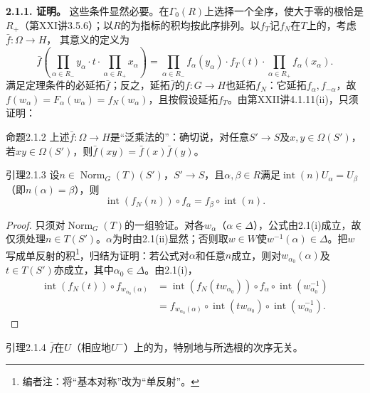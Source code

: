 \textbf{2.1.1. 证明。} 这些条件显然必要。在$\Gamma_0(R)$上选择一个全序，使大于零的根恰是$R_+$（第XXI讲3.5.6）；以$R$的为指标的积均按此序排列。以$f_T$记$f_N$在$T$上的，考虑$\bar f:\Omega\to H$，
其意义的定义为
\[\bar f\left(\prod_{\alpha\in R_-}y_\alpha\cdot t\cdot\prod_{\alpha\in R_+}x_\alpha\right)=\prod_{\alpha\in R_-}f_\alpha(y_\alpha)\cdot f_T(t)\cdot\prod_{\alpha\in R_+}f_\alpha(x_\alpha).\]
满足定理条件的必延拓$\bar f$；反之，延拓$\bar f$的$f:G\to H$也延拓$f_N$：它延拓$f_\alpha,f_{-\alpha}$，故$f(w_\alpha)=F_\alpha(w_\alpha)=f_N(w_\alpha)$，且按假设延拓$f_T$。由第XXII讲4.1.11(ii)，只须证明：
\begin{SGAresult}{命题}{2.1.2}
上述$\bar f:\Omega\to H$是“泛乘法的”：确切说，对任意$S'\to S$及$x,y\in\Omega(S')$，若$xy\in\Omega(S')$，则$\bar f(xy)=\bar f(x)\bar f(y)$。
\end{SGAresult}
\begin{SGAresult}{引理}{2.1.3}
设$n\in\operatorname{Norm}_G(T)(S')$，$S'\to S$，且$\alpha,\beta\in R$满足$\operatorname{int}(n)U_\alpha=U_\beta$（即$n(\alpha)=\beta$），则
\[\operatorname{int}(f_N(n))\circ f_\alpha=f_\beta\circ\operatorname{int}(n).\]
\end{SGAresult}
\begin{proof}
只须对$\operatorname{Norm}_G(T)$的一组验证。对各$w_\alpha$（$\alpha\in\Delta$），公式由2.1(i)成立，故仅须处理$n\in T(S')$。$\alpha$为时由2.1(ii)显然；否则取$w\in W$使$w^{-1}(\alpha)\in\Delta$。把$w$写成单反射的积\footnote{编者注：将“基本对称”改为“单反射”。}，归结为证明：若公式对$\alpha$和任意$n$成立，则对$w_{\alpha_0}(\alpha)$及$t\in T(S')$亦成立，其中$\alpha_0\in\Delta$。由2.1(i)，
\[\begin{aligned}\operatorname{int}(f_N(t))\circ f_{w_{\alpha_0}(\alpha)}&=\operatorname{int}(f_N(tw_{\alpha_0}))\circ f_\alpha\circ\operatorname{int}(w_{\alpha_0}^{-1})\\&=f_{w_{\alpha_0}(\alpha)}\circ\operatorname{int}(tw_{\alpha_0})\circ\operatorname{int}(w_{\alpha_0}^{-1}).\end{aligned}\]
\end{proof}
\begin{SGAresult}{引理}{2.1.4}
$\bar f$在$U$（相应地$U^-$）上的为，特别地与所选根的次序无关。
\end{SGAresult}
